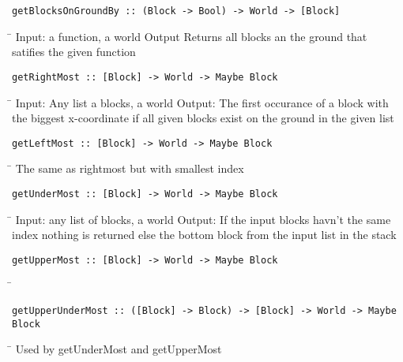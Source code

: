 \begin{verbatim}
getBlocksOnGroundBy :: (Block -> Bool) -> World -> [Block]
\end{verbatim}
\begin{tabbing}
\hspace*{1cm}\= \kill
\> Input: a function, a world Output Returns all blocks an the ground that \\
\> satifies the given function
\end{tabbing}
\begin{verbatim}
getRightMost :: [Block] -> World -> Maybe Block
\end{verbatim}
\begin{tabbing}
\hspace*{1cm}\= \kill
\> Input: Any list a blocks, a world Output: The first occurance of a block with \\
\> the biggest x-coordinate if all given blocks exist on the ground in the given list
\end{tabbing}
\begin{verbatim}
getLeftMost :: [Block] -> World -> Maybe Block
\end{verbatim}
\begin{tabbing}
\hspace*{1cm}\= \kill
\> The same as rightmost but with smallest index
\end{tabbing}
\begin{verbatim}
getUnderMost :: [Block] -> World -> Maybe Block
\end{verbatim}
\begin{tabbing}
\hspace*{1cm}\= \kill
\> Input: any list of blocks, a world Output: If the input blocks havn’t the same \\
\> index nothing is returned else the bottom block from the input list in the stack
\end{tabbing}
\begin{verbatim}
getUpperMost :: [Block] -> World -> Maybe Block
\end{verbatim}
\begin{tabbing}
\hspace*{1cm}\= \kill
\> 
\end{tabbing}
\begin{verbatim}
getUpperUnderMost :: ([Block] -> Block) -> [Block] -> World -> Maybe Block
\end{verbatim}
\begin{tabbing}
\hspace*{1cm}\= \kill
\> Used by getUnderMost and getUpperMost
\end{tabbing}
